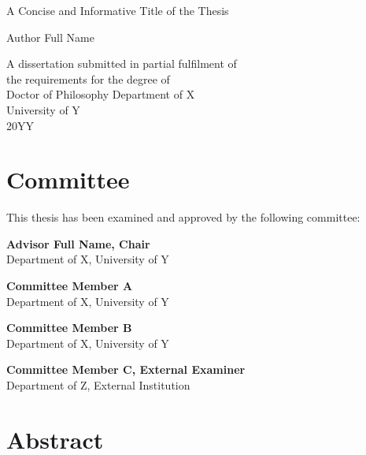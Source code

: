 \documentclass[12pt,a4paper,oneside]{book}
\newcommand{\ThesisTitle}{A Concise and Informative Title of the Thesis}
\newcommand{\ThesisAuthor}{Author Full Name}
\newcommand{\ThesisDegree}{Doctor of Philosophy}
\newcommand{\ThesisDepartment}{Department of X}
\newcommand{\ThesisInstitution}{University of Y}
\newcommand{\ThesisYear}{20YY}
\newcommand{\CommitteeChair}{Advisor Full Name, Chair}
\newcommand{\CommitteeMemberA}{Committee Member A}
\newcommand{\CommitteeMemberB}{Committee Member B}
\newcommand{\CommitteeMemberC}{Committee Member C, External Examiner}
\begin{document}
\frontmatter
{}

\begin{titlepage}
\centering
\vspace*{2cm}
{\Huge \ThesisTitle \par}
\vspace{2cm}
{\Large \ThesisAuthor \par}
\vspace{1cm}
A dissertation submitted in partial fulfilment of\\
the requirements for the degree of\\
\ThesisDegree
\vfill
\ThesisDepartment\\
\ThesisInstitution\\
\ThesisYear
\end{titlepage}

\chapter*{Committee}
\noindent This thesis has been examined and approved by the following committee:
\vspace{1em}

\noindent\textbf{\CommitteeChair}\\
\ThesisDepartment, \ThesisInstitution

\vspace{0.6em}
\noindent\textbf{\CommitteeMemberA}\\
\ThesisDepartment, \ThesisInstitution

\vspace{0.6em}
\noindent\textbf{\CommitteeMemberB}\\
\ThesisDepartment, \ThesisInstitution

\vspace{0.6em}
\noindent\textbf{\CommitteeMemberC}\\
Department of Z, External Institution

\chapter*{Abstract}
\end{document}
